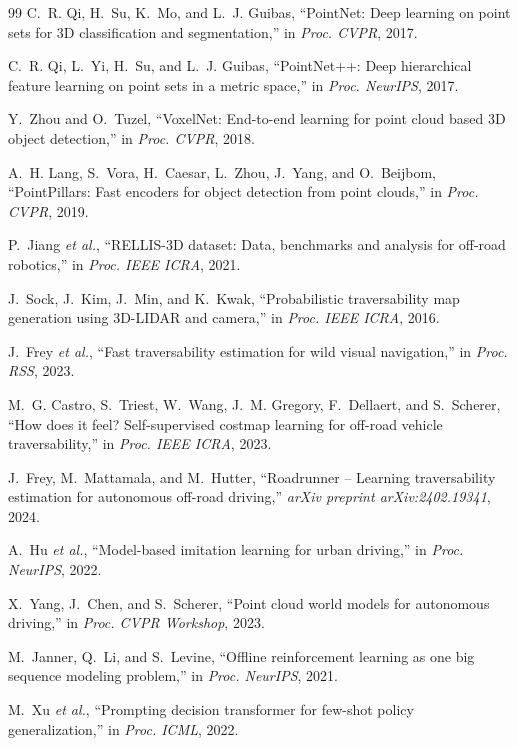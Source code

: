 \documentclass[sensors,article,submit,pdftex,moreauthors]{Definitions/mdpi}
\begin{document}
\begin{thebibliography}{99}
C.~R. Qi, H.~Su, K.~Mo, and L.~J. Guibas, ``PointNet: Deep learning on point sets for 3D classification and segmentation,'' in \textit{Proc. CVPR}, 2017.

C.~R. Qi, L.~Yi, H.~Su, and L.~J. Guibas, ``PointNet++: Deep hierarchical feature learning on point sets in a metric space,'' in \textit{Proc. NeurIPS}, 2017.

Y.~Zhou and O.~Tuzel, ``VoxelNet: End-to-end learning for point cloud based 3D object detection,'' in \textit{Proc. CVPR}, 2018.

A.~H. Lang, S.~Vora, H.~Caesar, L.~Zhou, J.~Yang, and O.~Beijbom, ``PointPillars: Fast encoders for object detection from point clouds,'' in \textit{Proc. CVPR}, 2019.

P.~Jiang \textit{et al.}, ``RELLIS-3D dataset: Data, benchmarks and analysis for off-road robotics,'' in \textit{Proc. IEEE ICRA}, 2021.

J.~Sock, J.~Kim, J.~Min, and K.~Kwak, ``Probabilistic traversability map generation using 3D-LIDAR and camera,'' in \textit{Proc. IEEE ICRA}, 2016.

J.~Frey \textit{et al.}, ``Fast traversability estimation for wild visual navigation,'' in \textit{Proc. RSS}, 2023.

M.~G. Castro, S.~Triest, W.~Wang, J.~M. Gregory, F.~Dellaert, and S.~Scherer, ``How does it feel? Self-supervised costmap learning for off-road vehicle traversability,'' in \textit{Proc. IEEE ICRA}, 2023.

J.~Frey, M.~Mattamala, and M.~Hutter, ``Roadrunner -- Learning traversability estimation for autonomous off-road driving,'' \textit{arXiv preprint arXiv:2402.19341}, 2024.

A.~Hu \textit{et al.}, ``Model-based imitation learning for urban driving,'' in \textit{Proc. NeurIPS}, 2022.

X.~Yang, J.~Chen, and S.~Scherer, ``Point cloud world models for autonomous driving,'' in \textit{Proc. CVPR Workshop}, 2023.

M.~Janner, Q.~Li, and S.~Levine, ``Offline reinforcement learning as one big sequence modeling problem,'' in \textit{Proc. NeurIPS}, 2021.

M.~Xu \textit{et al.}, ``Prompting decision transformer for few-shot policy generalization,'' in \textit{Proc. ICML}, 2022.


\end{thebibliography}
\end{document}
